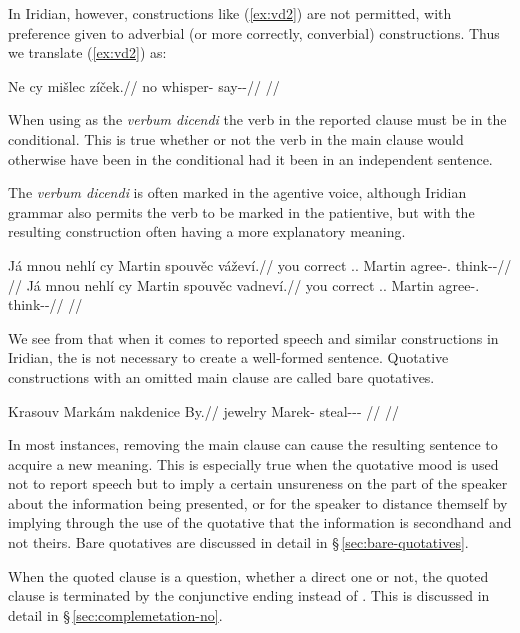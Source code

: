 In Iridian, however, constructions like (\ref{ex:vd2}) are not permitted, with
preference given to adverbial (or more correctly, converbial)
constructions. Thus we translate (\ref{ex:vd2}) as:

\pex
\begingl
\gla Ne cy mišlec zíček.//
\glb no  whisper-\Cv{} say-\Av{}-\Pf{}//
\glft {}//
\endgl
\xe

When using  as the \emph{verbum dicendi} the verb in the
reported clause must be in the conditional. This is true whether or not the verb
in the main clause would otherwise have been in the conditional had it been in
an independent sentence.

The \emph{verbum dicendi} is often marked in the agentive voice, although
Iridian grammar also permits the verb to be marked in the patientive, but with
the resulting construction often having a more explanatory meaning.

\pex
\a
\begingl
  \gla Já mnou nehlí cy Martin spouvěc váževí.//
  \glb you correct \Cop{}.\Sbj{}.\Quot{} \Quot{} Martin agree-\Cv{}.\Ipf{} think-\Av{}-\Cont{}//
  \glft {}//
\endgl
\a
\begingl
  \gla Já mnou nehlí cy Martin spouvěc vadneví.//
  \glb you correct \Cop{}.\Sbj{}.\Quot{} \Quot{} Martin agree-\Cv{}.\Ipf{} think-\Pv{}-\Cont{}//
  \glft {}//
\endgl
\xe

We see from  that when it comes to reported speech and similar constructions in
Iridian, the  is not necessary to
create a well-formed sentence. Quotative constructions with an omitted main
clause are called {\sc bare quotatives}.

\pex
\begingl
  \gla Krasouv Markám nakdenice By.//
  \glb jewelry Marek-\Agt{} steal-\Pv{}-\Pf{}-\Cnj{} \Quot{}//
  \glft {}//
\endgl
\xe

In most instances, removing the main clause can cause the resulting sentence to
acquire a new meaning. This is especially true when the quotative mood is used
not to report speech but to imply a certain unsureness on the part of the
speaker about the information being presented, or for the speaker to distance
themself by implying through the use of the quotative that the information is
secondhand and not theirs. Bare quotatives are discussed in detail in
\S\,\ref{sec:bare-quotatives}.

When the quoted clause is a question, whether a direct one or not, the quoted
clause is terminated by the conjunctive ending  instead of .
This is discussed in detail in \S\,\ref{sec:complemetation-no}.

